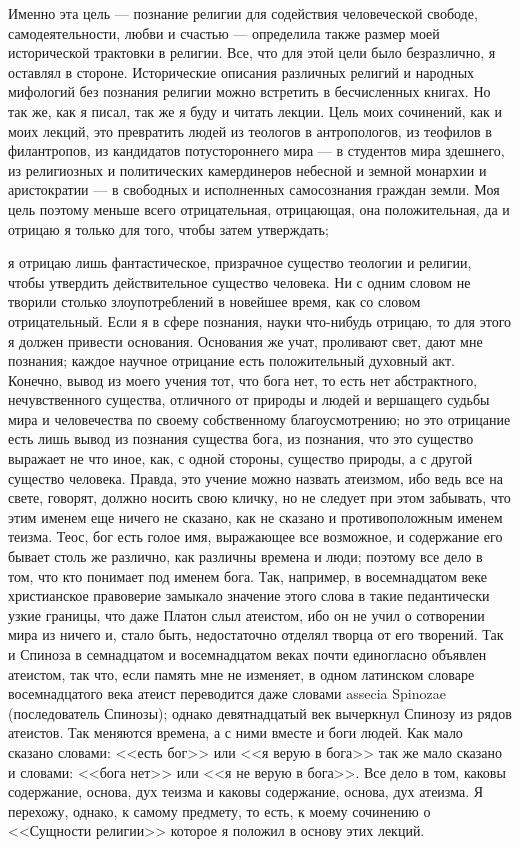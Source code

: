 \documentclass[12pt]{article}
\begin{document}
Именно эта цель --- познание религии для содействия человеческой свободе, самодеятельности, любви и счастью --- определила также размер моей исторической трактовки в религии. Все, что для этой цели было безразлично, я оставлял в стороне. Исторические описания различных религий и народных мифологий без познания религии можно встретить в бесчисленных книгах. Но так же, как я писал, так же я буду и читать лекции. Цель моих сочинений, как и моих лекций, это превратить людей из теологов в антропологов, из теофилов в филантропов, из кандидатов потустороннего мира --- в студентов мира здешнего, из религиозных и политических камердинеров небесной и земной монархии и аристократии --- в свободных и исполненных самосознания граждан земли. Моя цель поэтому меньше всего отрицательная, отрицающая, она положительная, да и отрицаю я только для того, чтобы затем утверждать; 

я отрицаю лишь фантастическое, призрачное существо теологии и религии, чтобы утвердить действительное существо человека. Ни с одним словом не творили столько злоупотреблений в новейшее время, как со словом отрицательный. Если я в сфере познания, науки что-нибудь отрицаю, то для этого я должен привести основания. Основания же учат, проливают свет, дают мне познания; каждое научное отрицание есть положительный духовный акт. Конечно, вывод из моего учения тот, что бога нет, то есть нет абстрактного, нечувственного существа, отличного от природы и людей и вершащего судьбы мира и человечества по своему собственному благоусмотрению; но это отрицание есть лишь вывод из познания существа бога, из познания, что это существо выражает не что иное, как, с одной стороны, существо природы, а с другой существо человека. Правда, это учение можно назвать атеизмом, ибо ведь все на свете, говорят, должно носить свою кличку, но не следует при этом забывать, что этим именем еще ничего не сказано, как не сказано и противоположным именем теизма. Теос, бог есть голое имя, выражающее все возможное, и содержание его бывает столь же различно, как различны времена и люди; поэтому все дело в том, что кто понимает под именем бога. Так, например, в восемнадцатом веке христианское правоверие замыкало значение этого слова в такие педантически узкие границы, что даже Платон слыл атеистом, ибо он не учил о сотворении мира из ничего и, стало быть, недостаточно отделял творца от его творений. Так и Спиноза в семнадцатом и восемнадцатом веках почти единогласно объявлен атеистом, так что, если память мне не изменяет, в одном латинском словаре восемнадцатого века атеист переводится даже словами assecia Spinozae (последователь Спинозы); однако девятнадцатый век вычеркнул Спинозу из рядов атеистов. Так меняются времена, а с ними вместе и боги людей. Как мало сказано словами: <<есть бог>>  или <<я верую в бога>>  так же мало сказано и словами: <<бога нет>>  или <<я не верую в бога>>. Все дело в том, каковы содержание, основа, дух теизма и каковы содержание, основа, дух атеизма. Я перехожу, однако, к самому предмету, то есть, к моему сочинению о <<Сущности религии>>  которое я положил в основу этих лекций.
\end{document}
